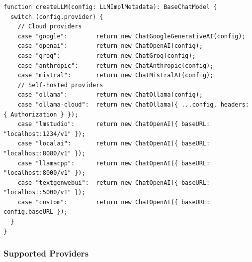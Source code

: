 \documentclass[11pt,a4paper]{report}
\begin{document}
\begin{lstlisting}[style=tsstyle,caption={Provider-agnostic LLM factory.}]
function createLLM(config: LLMImplMetadata): BaseChatModel {
  switch (config.provider) {
    // Cloud providers
    case "google":        return new ChatGoogleGenerativeAI(config);
    case "openai":        return new ChatOpenAI(config);
    case "groq":          return new ChatGroq(config);
    case "anthropic":     return new ChatAnthropic(config);
    case "mistral":       return new ChatMistralAI(config);
    // Self-hosted providers
    case "ollama":        return new ChatOllama(config);
    case "ollama-cloud":  return new ChatOllama({ ...config, headers: { Authorization } });
    case "lmstudio":      return new ChatOpenAI({ baseURL: "localhost:1234/v1" });
    case "localai":       return new ChatOpenAI({ baseURL: "localhost:8080/v1" });
    case "llamacpp":      return new ChatOpenAI({ baseURL: "localhost:8000/v1" });
    case "textgenwebui":  return new ChatOpenAI({ baseURL: "localhost:5000/v1" });
    case "custom":        return new ChatOpenAI({ baseURL: config.baseURL });
  }
}
\end{lstlisting}

\subsubsection{Supported Providers}
\end{document}
